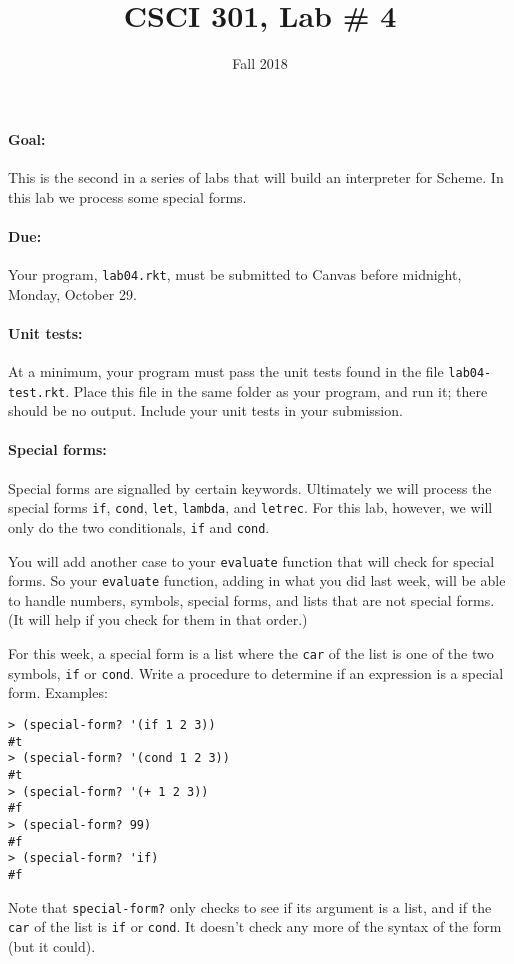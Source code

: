 \documentclass{article}
\title{CSCI 301, Lab \# 4}
\author{Fall 2018}
\date{}
\begin{document}
\maketitle


\paragraph{Goal:} This is the second in a series of labs that will
build an interpreter for Scheme.  In this lab we process some special forms. 

\paragraph{Due:} Your program, {\tt lab04.rkt}, must be submitted to
Canvas before midnight, Monday, October 29.

\paragraph{Unit tests:}
At a minimum, your program must pass the unit tests found in the
file {\tt lab04-test.rkt}.  Place this file in the same folder
as your program, and run it;  there should be no output.  Include
your unit tests in your submission.

\paragraph{Special forms:}
Special forms are signalled by certain keywords.  Ultimately we
will process the special forms {\tt if}, {\tt cond}, {\tt let},
{\tt lambda}, and {\tt letrec}.  For this lab, however, we will only
do the two conditionals, {\tt if} and {\tt cond}.

You will add another case to your {\tt evaluate} function that will
check for special forms. So your {\tt evaluate} function, adding in
what you did last week, will be able to handle numbers, symbols,
special forms, and lists that are not special forms.  (It will help if
you check for them in that order.)

For this week, a special form is a list
where the {\tt car} of the list is one of the two symbols, {\tt if} or
{\tt cond}.  
Write a procedure to determine if an expression is a special form.
Examples:
\begin{Verbatim}[frame=single]
> (special-form? '(if 1 2 3))
#t
> (special-form? '(cond 1 2 3))
#t
> (special-form? '(+ 1 2 3))
#f
> (special-form? 99)
#f
> (special-form? 'if)
#f
\end{Verbatim}
Note that {\tt special-form?} only checks to see if its argument is a
list, and if the {\tt car} of the list is {\tt if} or {\tt cond}.  It
doesn't check any more of the syntax of the form (but it could).
\end{document}
